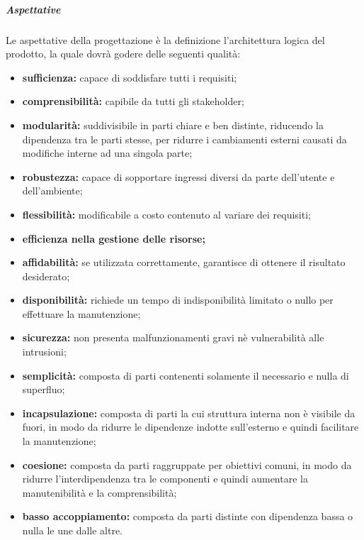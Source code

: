 				\subparagraph{Aspettative}
					Le aspettative della progettazione è la definizione l'architettura logica del prodotto, la quale dovrà godere delle seguenti qualità:
					\begin{itemize}
						\item \textbf{sufficienza:} capace di soddisfare tutti i requisiti;
						\item \textbf{comprensibilità:} capibile da tutti gli stakeholder;
						\item \textbf{modularità:} suddivisibile in parti chiare e ben distinte, riducendo la dipendenza tra le parti stesse, per ridurre i cambiamenti esterni causati da modifiche interne ad una singola parte;
						\item \textbf{robustezza:} capace di sopportare ingressi diversi da parte dell'utente e dell'ambiente;
						\item \textbf{flessibilità:} modificabile a costo contenuto al variare dei requisiti;
						\item \textbf{efficienza nella gestione delle risorse;}
						\item \textbf{affidabilità:} se utilizzata correttamente, garantisce di ottenere il risultato desiderato;
						\item \textbf{disponibilità:} richiede un tempo di indisponibilità limitato o nullo per effettuare la manutenzione;
						\item \textbf{sicurezza:} non presenta malfunzionamenti gravi nè vulnerabilità alle intrusioni;
						\item \textbf{semplicità:} composta di parti contenenti solamente il necessario e nulla di superfluo;
						\item \textbf{incapsulazione:} composta di parti la cui struttura interna non è visibile da fuori, in modo da ridurre le dipendenze indotte sull'esterno e quindi facilitare la manutenzione;
						\item \textbf{coesione:} composta da parti raggruppate per obiettivi comuni, in modo da ridurre l'interdipendenza tra le componenti e quindi aumentare la manutenibilità e la comprensibilità;
						\item \textbf{basso accoppiamento:} composta da parti distinte con dipendenza bassa o nulla le une dalle altre.
					\end{itemize}
				

